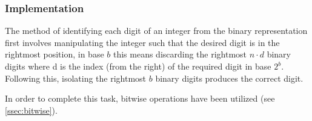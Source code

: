 \documentclass[12pt]{article}
\begin{document}
	\subsubsection{Implementation}
	The method of identifying each digit of an integer from the binary representation first involves manipulating the integer such that the desired digit is in the rightmost position, in base $b$ this means discarding the rightmost $n \cdot d$ binary digits where d is the index (from the right) of the required digit in base $2^b$. Following this, isolating the rightmost $b$ binary digits produces the correct digit.  
		\par
	In order to complete this task, bitwise operations have been utilized (see \ref{ssec:bitwise}).


	\begin{table}[!htb]
		\centering
		

\end{table}
\end{document}

